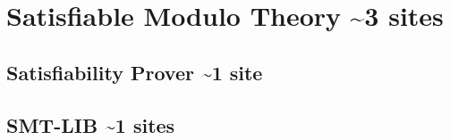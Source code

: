 

\section{Satisfiable Modulo Theory \textasciitilde 3 sites}



\subsection{Satisfiability Prover \textasciitilde 1 site}
\subsection{SMT-LIB \textasciitilde 1 sites}
